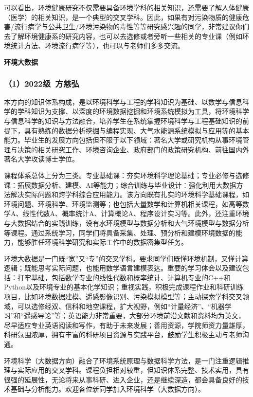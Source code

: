 \vspace{10pt}

可以看出，环境健康研究不仅需要具备环境学科的相关知识，还需要了解人体健康（医学）的相关知识，是一个典型的交叉学科。因此，如果有对污染物质的健康危害/流行病学与公共卫生/环境污染物的毒性等等研究感兴趣的同学，非常建议你们去了解环境健康系的研究内容，也可以去选修或者旁听一些相关的专业课（例如环境统计方法、环境流行病学等），也可以与老师们多多交流。

\vspace{10pt}

\textbf{环境大数据}

\subsubsection{（1）2022级\ 方慈弘}

本方向的知识体系构成，是以环境科学与工程的学科知识为基础、以数学与信息科学的学科知识为支撑、以深度的环境数据挖掘和环境系统模拟为工具，将环境科学与信息科学的知识与方法融合，培养学生在系统掌握环境科学与工程基础知识的前提下，具有熟练的数据分析挖掘与编程实现、大气水能源系统模拟与应用等的基本能力。毕业生的发展方向包括但不限于以下领域：著名大学或研究机构从事环境管理与决策的相关研究工作、环境咨询企业、政府部门的政策研究机构、前往国内外著名大学攻读博士学位。

\vspace{10pt}

课程体系总体上分为三类。专业基础课：夯实环境科学理论基础；专业必修与选修课：拓展数据分析、建模、AI等能力；综合训练与毕业设计：强化利用大数据方法解决实际问题和跨学科综合应用能力。该方向既有扎实的环境科学基础课程，如环境问题、环境科学、环境监测等；也包括大量数学和计算机相关课程，如高等数学A、线性代数A、概率统计A、计算概论A、程序设计实习等。此外，还注重环境与大数据结合的实践训练，设有水环境模型与数据分析和大气环境模型与数据分析等课程。通过系统学习，同学们将具备采集、处理、预分析和建模环境数据的能力，能够胜任环境科学研究和实际工作中的数据密集型任务。

\vspace{10pt}

环境大数据是一门既“宽”又“专”的交叉学科。要求同学们既懂环境机制，又懂计算逻辑；既能思考实际问题，也能用数学语言建模表达。重要的学习体会以及建议包括：打牢基础，包括数学专业的线性代数和概率统计、计算机专业的C++和Python以及环境专业的基本化学知识；重视实践，积极完成课程作业和科研训练项目，比如环境数据建模、遥感影像识别、污染模拟模型等；主动探索学科交叉领域，可以选修经双、信科和地空课程，扩大视野，例如“计量经济”、“机器学习”和“遥感导论”等；英语能力非常重要，大部分环境前沿文献和资料均为英文，尽早适应专业英语阅读和写作，有助于未来发展；善用资源，学院师资力量雄厚，科研氛围浓厚，拥有丰富的科研项目资源与实践平台，鼓励学生积极主动与老师沟通。

\vspace{10pt}

环境科学（大数据方向）融合了环境系统原理与数据科学方法，是一门注重逻辑推理与实际应用的交叉学科。课程负担相对较重，但知识体系完整、技术实用，具有很强的延展性，无论将来从事科研、进入企业，还是继续深造，都会具备良好的技术基础与分析能力。欢迎各位新同学加入环境科学（大数据方向）。
